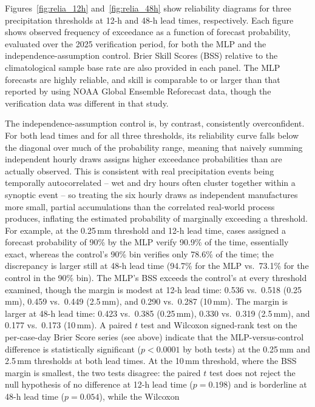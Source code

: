 \documentclass[11pt]{article}
\begin{document}
Figures~\ref{fig:relia_12h} and~\ref{fig:relia_48h} show reliability diagrams
for three precipitation thresholds at 12-h and 48-h lead times, respectively.
Each figure shows observed frequency of exceedance as a function of forecast
probability, evaluated over the 2025 verification period, for both the MLP
and the independence-assumption control.  Brier Skill Scores (BSS) relative
to the climatological sample base rate are also provided in each panel.
The MLP forecasts are highly reliable, and skill is comparable to or larger than
that reported by \citet{jesberg2023} using NOAA Global Ensemble Reforecast
data, though the verification data was different in that study.

The independence-assumption control is, by contrast, consistently
overconfident.  For both lead times and for all three thresholds, its
reliability curve falls below the diagonal over much of the probability
range, meaning that naively summing independent hourly draws assigns higher
exceedance probabilities than are actually observed.  This is consistent
with real precipitation events being temporally autocorrelated -- wet and
dry hours often cluster together within a synoptic event -- so treating the six
hourly draws as independent manufactures more small, partial accumulations
than the correlated real-world process produces, inflating the estimated
probability of marginally exceeding a threshold.  For example, at the
0.25\,mm threshold and 12-h lead time, cases assigned a forecast probability
of 90\% by the MLP verify 90.9\% of the time, essentially exact, whereas the
control's 90\% bin verifies only 78.6\% of the time; the discrepancy is
larger still at 48-h lead time (94.7\% for the MLP vs.\ 73.1\% for the
control in the 90\% bin).  The MLP's BSS exceeds the control's at every
threshold examined, though the margin is modest at 12-h lead time: 0.536
vs.\ 0.518 (0.25\,mm), 0.459 vs.\ 0.449 (2.5\,mm), and 0.290 vs.\ 0.287
(10\,mm).  The margin is larger at 48-h lead time: 0.423 vs.\ 0.385
(0.25\,mm), 0.330 vs.\ 0.319 (2.5\,mm), and 0.177 vs.\ 0.173 (10\,mm).  A
paired $t$ test and Wilcoxon signed-rank test on the per-case-day Brier
Score series (see above) indicate that the MLP-versus-control difference is
statistically significant ($p < 0.0001$ by both tests) at the 0.25\,mm and
2.5\,mm thresholds at both lead times.  At the 10\,mm threshold, where the
BSS margin is smallest, the two tests disagree: the paired $t$ test does not
reject the null hypothesis of no difference at 12-h lead time ($p = 0.198$)
and is borderline at 48-h lead time ($p = 0.054$), while the Wilcoxon
\end{document}
